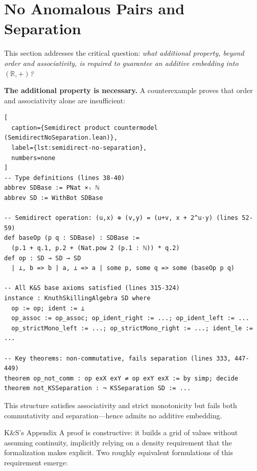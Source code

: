 \documentclass[11pt]{article}
\theoremstyle{definition}
\theoremstyle{remark}
\begin{document}
\section{No Anomalous Pairs and Separation}
\label{sec:nap-separation}

This section addresses the critical question: \emph{what additional property, beyond order and associativity,
is required to guarantee an additive embedding into $(\mathbb{R}, +)$?}

\textbf{The additional property is necessary.} A counterexample proves that order and associativity
alone are insufficient:

\begin{lstlisting}[
  caption={Semidirect product countermodel (SemidirectNoSeparation.lean)},
  label={lst:semidirect-no-separation},
  numbers=none
]
-- Type definitions (lines 38-40)
abbrev SDBase := PNat ×ₗ ℕ
abbrev SD := WithBot SDBase

-- Semidirect operation: (u,x) ⊕ (v,y) = (u+v, x + 2^u·y) (lines 52-59)
def baseOp (p q : SDBase) : SDBase :=
  (p.1 + q.1, p.2 + (Nat.pow 2 (p.1 : ℕ)) * q.2)
def op : SD → SD → SD
  | ⊥, b => b | a, ⊥ => a | some p, some q => some (baseOp p q)

-- All K&S base axioms satisfied (lines 315-324)
instance : KnuthSkillingAlgebra SD where
  op := op; ident := ⊥
  op_assoc := op_assoc; op_ident_right := ...; op_ident_left := ...
  op_strictMono_left := ...; op_strictMono_right := ...; ident_le := ...

-- Key theorems: non-commutative, fails separation (lines 333, 447-449)
theorem op_not_comm : op exX exY ≠ op exY exX := by simp; decide
theorem not_KSSeparation : ¬ KSSeparation SD := ...
\end{lstlisting}

\noindent This structure satisfies associativity and strict monotonicity but fails both commutativity and separation---hence admits no additive embedding.

K\&S's Appendix A proof is constructive: it builds a grid of values without assuming continuity,
implicitly relying on a density requirement that the formalization makes explicit.
Two roughly equivalent formulations of this requirement emerge:
\end{document}
